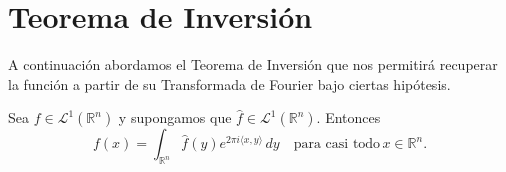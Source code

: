 \section{Teorema de Inversión}
A continuación abordamos el Teorema de Inversión que nos permitirá recuperar la función a partir de su Transformada de Fourier bajo ciertas hipótesis. 

\begin{teorema}[de Inversión]\label{teo:inv} Sea $f \in \mathscr{L}^1(\mathbb{R}^n)$ y supongamos que $\widehat{f}    \in \mathscr{L}^1(\mathbb{R}^n)$. Entonces
\begin{equation}\label{eq:teoinv}
    f(x) = \int_{\mathbb{R}^n}\widehat{f}(y)e^{2\pi i \langle x, y \rangle} \, dy \quad \text{para casi todo} \, x \in \mathbb{R}^n.
\end{equation}
   
\end{teorema}

